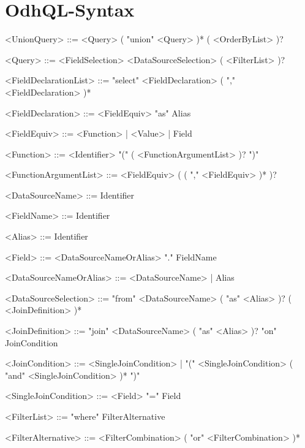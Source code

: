 \chapter{OdhQL-Syntax}\label{app:odhql-syntax}



\begin{grammar}
\small

    <UnionQuery> ::= <Query> ( "union" <Query> )* ( <OrderByList> )?

    <Query> ::= <FieldSelection>  <DataSourceSelection> ( <FilterList> )?

    <FieldDeclarationList> ::= "select" <FieldDeclaration> ( "," <FieldDeclaration> )*

    <FieldDeclaration> ::= <FieldEquiv> "as" Alias

    <FieldEquiv> ::= <Function> | <Value> | Field

    <Function> ::= <Identifier> "(" ( <FunctionArgumentList> )? ")"

    <FunctionArgumentList> ::= <FieldEquiv> ( ( "," <FieldEquiv> )* )?

    <DataSourceName> ::= Identifier

    <FieldName> ::= Identifier

    <Alias> ::= Identifier

    <Field> ::= <DataSourceNameOrAlias> "." FieldName

    <DataSourceNameOrAlias> ::= <DataSourceName> | Alias

    <DataSourceSelection> ::= "from" <DataSourceName> ( "as" <Alias> )? ( <JoinDefinition> )*

    <JoinDefinition> ::= "join" <DataSourceName> ( "as" <Alias> )? "on" JoinCondition

    <JoinCondition> ::= <SingleJoinCondition> | "(" <SingleJoinCondition> ( "and" <SingleJoinCondition> )* ")"

    <SingleJoinCondition> ::= <Field> "=" Field

    <FilterList> ::= "where" FilterAlternative

    <FilterAlternative> ::= <FilterCombination> ( "or" <FilterCombination> )*


\end{grammar}
